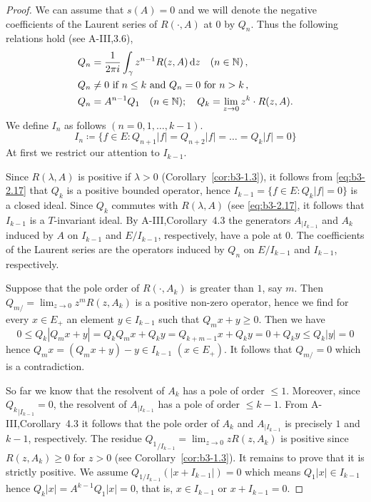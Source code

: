 \begin{proof}
	We can assume that $s(A) = 0$ and we will denote the negative coefficients of the Laurent series of $R(\cdot,A)$ at $0$ by $Q_{n}$.
	Thus the following relations hold (see A-III,3.6),
	\begin{equation}\label{eq:b3-2.17}
	\begin{split}
		Q_{n} &= \frac{1}{2\pi i}\int_{\gamma} z^{n-1}R(z,A)  \mathop{}\!\mathrm{d}{z} \quad (n \in \mathbb{N})\,, \\
		Q_{n} &\neq 0 \text{ if } n \leq k \text{ and } Q_{n} = 0 \text{ for } n > k\,, \\
		Q_{n} &= A^{n-1}Q_{1} \quad (n \in \mathbb{N}); \quad Q_{k} = \lim_{z \to 0}z^{k}\cdot R(z,A).
	\end{split}
	\end{equation}
	We define $I_{n}$ as follows $(n = 0,1,\ldots,k-1)$.
	\[
	I_{n} \coloneqq \{f \in E \colon Q_{n+1}|f| = Q_{n+2}|f| = \ldots = Q_{k}|f| = 0\}
	\]
	At first we restrict our attention to $I_{k-1}$.
	
	Since $R(\lambda,A)$ is positive if $\lambda > 0$ (Corollary~\ref{cor:b3-1.3}), it follows from \eqref{eq:b3-2.17} that $Q_{k}$ is a positive bounded operator, hence $I_{k-1} = \{f \in E \colon Q_{k}|f| = 0\}$ is a closed ideal.
	Since $Q_{k}$ commutes with $R(\lambda,A)$ (see \eqref{eq:b3-2.17}, it follows that $I_{k-1}$ is a $T$-invariant ideal.
	By A-III,Corollary~4.3 the generators $A_{|I_{k-1}}$ and $A_{k}$ induced by $A$ on $I_{k-1}$ and $E/I_{k-1}$, respectively, have a pole at $0$.
	The coefficients of the Laurent series are the operators induced by $Q_{n}$ on $E/I_{k-1}$ and $I_{k-1}$, respectively.
	
	Suppose that the pole order of $R(\cdot,A_{k})$ is greater than $1$, say $m$.
	Then $Q_{m/} = \lim_{z \to 0}z^{m}R(z,A_{k})$ is a positive non-zero operator, hence we find for every $x \in E_{+}$ an element $y \in I_{k-1}$ such that $Q_{m}x + y \geq 0$.
	Then we have
	\[
	0 \leq Q_{k}|Q_{m}x + y| = Q_{k}Q_{m}x + Q_{k}y = Q_{k+m-1}x + Q_{k}y = 0 + Q_{k}y \leq Q_{k}|y| = 0
	\]
	hence $Q_{m}x = (Q_{m}x + y) - y \in I_{k-1}$ $(x \in E_{+})$.
	It follows that $Q_{m/} = 0$ which is a contradiction.
	
	So far we know that the resolvent of $A_{k}$ has a pole of order $\leq 1$.
	Moreover, since ${Q_{k}}_{|I_{k-1}} = 0$, 
	the resolvent of $A_{|I_{k-1}}$ has a pole of order $\leq k-1$.
	From A-III,Corollary~4.3 it follows that the pole order of $A_{k}$ and $A_{|I_{k-1}}$ is precisely $1$ and $k-1$, respectively.
	The residue ${Q_{1}}_{/I_{k-1}} = \lim_{z \to 0}zR(z,A_{k})$ is positive since $R(z,A_{k}) \geq 0$ for $z > 0$ (see Corollary~\ref{cor:b3-1.3}).
	It remains to prove that it is strictly positive. We assume $Q_{1/I_{k-1}}(|x + I_{k-1}|) = 0$ which means $Q_{1}|x| \in I_{k-1}$ hence $Q_{k}|x| = A^{k-1}Q_{1}|x| = 0$, that is, $x \in I_{k-1}$ or $x + I_{k-1} = 0$.
	

\end{proof}
